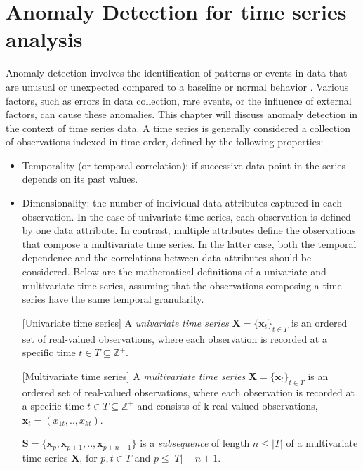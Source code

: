 \section{Anomaly Detection for time series analysis}
\label{s:anomaly-detection}
Anomaly detection involves the identification of patterns or events in data that are unusual or unexpected compared to a baseline or normal behavior \cite{chandola_2019}. Various factors, such as errors in data collection, rare events, or the influence of external factors, can cause these anomalies. This chapter will discuss anomaly detection in the context of time series data. A time series is generally considered a collection of observations indexed in time order, defined by the following properties:
\begin{itemize}
    \item Temporality (or temporal correlation): if successive data point in the series depends on its past values.
    \item Dimensionality: the number of individual data attributes captured in each observation. In the case of univariate time series, each observation is defined by one data attribute. In contrast, multiple attributes define the observations that compose a multivariate time series. In the latter case, both the temporal dependence and the correlations between data attributes should be considered. Below are the mathematical definitions of a univariate and multivariate time series, assuming that the observations composing a time series have the same temporal granularity.
    \begin{definition} \label{def:univariate-timeseries}
    [Univariate time series] A \textit{univariate time series} $\textbf{X}=\{\textbf{x}_t\}_{t\in T}$ is an ordered set of real-valued observations, where each observation is recorded at a specific time $t \in T \subseteq \mathbb{Z}^+$. 
    \end{definition}
    \begin{definition} \label{def:multivariate-timeseries}
    [Multivariate time series] A \textit{multivariate time series} $\textbf{X}=\{\textbf{x}_t\}_{t\in T}$ is an ordered set of real-valued observations, where each observation is recorded at a specific time $t \in T \subseteq \mathbb{Z}^+$ and consists of k real-valued observations, $\textbf{x}_t = (x_{1t}, .., x_{kt})$. 
    \end{definition}    
    \begin{definition}
    [Subsequence] $\textbf{S}=\{\textbf{x}_p,\textbf{x}_{p+1},..,\textbf{x}_{p+n-1}\}$ is a \textit{subsequence} of length $n \leq |T|$ of a multivariate time series \textbf{X}, for $p,t \in T$ and $p \leq |T| - n + 1$.

\end{definition}
\end{itemize}
